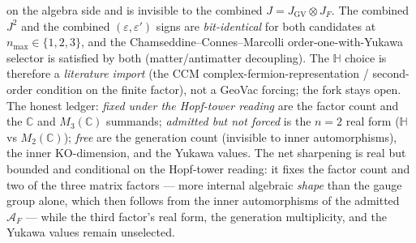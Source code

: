 \documentclass[11pt]{article}
\begin{document}
on the algebra side and is invisible to the combined
$J = J_{\mathrm{GV}} \otimes J_F$. The combined $J^2$ and the combined
$(\varepsilon, \varepsilon')$ signs are
\emph{bit-identical} for both candidates at $n_{\max} \in \{1, 2, 3\}$,
and the Chamseddine--Connes--Marcolli order-one-with-Yukawa selector
is satisfied by both (matter/antimatter decoupling). The $\mathbb{H}$
choice is therefore a \emph{literature import} (the CCM
complex-fermion-representation / second-order condition on the finite
factor), not a GeoVac forcing; the fork stays open. The honest
ledger: \emph{fixed under the Hopf-tower reading} are the factor count
and the $\mathbb{C}$ and $M_3(\mathbb{C})$ summands; \emph{admitted but not forced} is the
$n = 2$ real form ($\mathbb{H}$ vs $M_2(\mathbb{C})$); \emph{free} are
the generation count (invisible to inner automorphisms), the inner
KO-dimension, and the Yukawa values. The net sharpening is real but
bounded and conditional on the Hopf-tower reading: it fixes the factor
count and two of the three matrix factors --- more internal algebraic
\emph{shape} than the gauge group alone, which then follows from the
inner automorphisms of the admitted $\mathcal{A}_F$ --- while the third
factor's real form, the generation multiplicity, and the Yukawa values
remain unselected.
\end{document}
